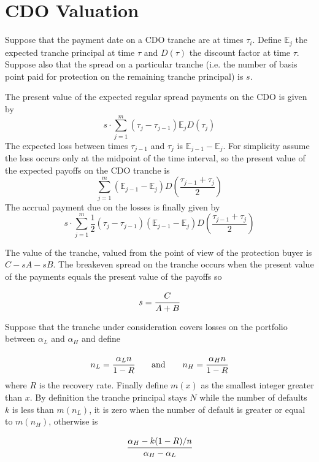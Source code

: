 \section{CDO Valuation}
Suppose that the payment date on a CDO tranche are at times $\tau_i$. Define $\mathbb{E}_j$ the expected 
tranche principal at time $\tau$ and $D(\tau)$ the discount factor at time $\tau$. Suppose also that the spread
on a particular tranche (i.e. the number of basis point paid for protection on the remaining tranche principal) is $s$. 

The present value of the expected regular spread payments on the CDO is given by
\begin{equation}
s\cdot \sum_{j=1}^{m}(\tau_j - \tau_{j-1})\mathbb{E}_{j}D(\tau_j)
\label{eq:A}
\end{equation}
The expected loss between times $\tau_{j-1}$ and $\tau_j$ is $\mathbb{E}_{j-1}-\mathbb{E}_j$. For simplicity assume
the loss occurs only at the midpoint of the time interval, so the present value of the expected payoffs on the CDO tranche is
\begin{equation}
\sum_{j=1}^{m}(\mathbb{E}_{j-1}-\mathbb{E}_j)D\left(\frac{\tau_{j-1}+\tau_j}{2}\right)
\label{eq:C}
\end{equation}
The accrual payment due on the losses is finally given by
\begin{equation}
s\cdot\sum_{j=1}^{m}\frac{1}{2}(\tau_j - \tau_{j-1})(\mathbb{E}_{j-1}-\mathbb{E}_j)D(\frac{\tau_{j-1}+\tau_j}{2})
\label{eq:B}
\end{equation}

The value of the tranche, valued from the point of view of the protection buyer is $C-sA-sB$. The breakeven spread 
on the tranche occurs when the present value of the payments equals the present value of the payoffs so

\[ s = \cfrac{C}{A+B}\]

Suppose that the tranche under consideration covers losses on the portfolio between $\alpha_L$ and $\alpha_H$ and
define

\[n_L = \cfrac{\alpha_L n}{1-R}\qquad \mathrm{and}\qquad n_H = \cfrac{\alpha_H n}{1-R}\]
where $R$ is the recovery rate. Finally define $m(x)$ as the smallest integer greater than $x$.
By definition the tranche principal stays $N$ while the number of defaults $k$ is less than $m(n_L)$, it 
is zero when the number of default is greater or equal to $m(n_H)$, otherwise is

\[\cfrac{\alpha_H -k(1-R)/n}{\alpha_H - \alpha_L}\]

